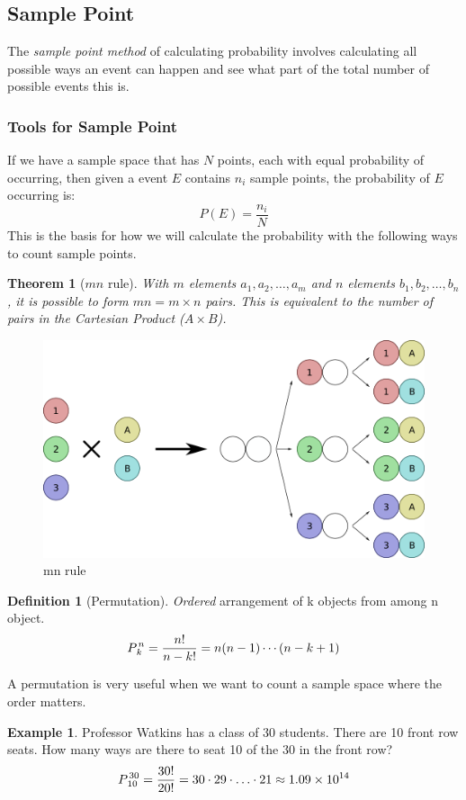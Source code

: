 \documentclass{article}
\theoremstyle{plain}
\newtheorem{thm}{Theorem}[section]
\theoremstyle{definition}
\newtheorem{defn}{Definition}[section]
\newtheorem{example}{Example}[section]
\theoremstyle{remark}
\begin{document}
\subsection{Sample Point}
The \textit{sample point method} of calculating probability involves calculating all possible ways an event can happen and see what part of the total number of possible events this is.

\subsubsection{Tools for Sample Point}
If we have a sample space that has $N$ points, each with equal probability of occurring, then given a event $E$ contains $n_i$ sample points, the probability of $E$ occurring is:
$$
P(E) = \frac{n_i}{N}
$$
This is the basis for how we will calculate the probability with the following ways to count sample points.

\begin{thm}[$mn$ rule] 
With $m$ elements $a_1, a_2, \ldots, a_m$ and $n$ elements $b_1, b_2, \ldots, b_n$, it is possible to form $mn = m \times n$ pairs. This is equivalent to the number of pairs in the Cartesian Product ($A \times B$).
\end{thm}

\begin{figure}[h!]
\centering
\includegraphics[scale=.5]{counting_mn}
\caption{mn rule}
\label{mn_diagram}
\end{figure}

\begin{defn}[Permutation]
\textit{Ordered} arrangement of k objects from among n object.
$$
\perm{P}{n}{k} = \frac{n!}{n-k!} = n(n-1)\cdots(n-k+1)
$$
\end{defn}
A permutation is very useful when we want to count a sample space where the order matters.
\begin{example}
  Professor Watkins has a class of 30 students. There are 10 front row seats. How many ways are there to seat 10 of the 30 in the front row?
$$
\perm{P}{30}{10} = \frac{30!}{20!} = 30\cdot29\cdot \ldots \cdot 21 \approx 1.09 \times 10^{14}
$$
\end{example}
\end{document}
